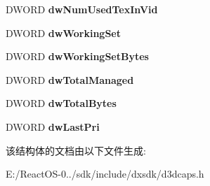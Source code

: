 \begin{DoxyCompactItemize}
D\+W\+O\+RD {\bfseries dw\+Num\+Used\+Tex\+In\+Vid}
\item 
\mbox{\label{struct___d3_d_d_e_v_i_n_f_o___t_e_x_t_u_r_e_m_a_n_a_g_e_r_acc6c6669b580c447033b7dd9b5a75e49}} 
D\+W\+O\+RD {\bfseries dw\+Working\+Set}
\item 
\mbox{\label{struct___d3_d_d_e_v_i_n_f_o___t_e_x_t_u_r_e_m_a_n_a_g_e_r_af2b22a47b65f8ba0104654f09753a4dd}} 
D\+W\+O\+RD {\bfseries dw\+Working\+Set\+Bytes}
\item 
\mbox{\label{struct___d3_d_d_e_v_i_n_f_o___t_e_x_t_u_r_e_m_a_n_a_g_e_r_aa044f4d7877c6bdfdb582fa698e931dc}} 
D\+W\+O\+RD {\bfseries dw\+Total\+Managed}
\item 
\mbox{\label{struct___d3_d_d_e_v_i_n_f_o___t_e_x_t_u_r_e_m_a_n_a_g_e_r_a27299f6736945b3150b912683c08e0ba}} 
D\+W\+O\+RD {\bfseries dw\+Total\+Bytes}
\item 
\mbox{\label{struct___d3_d_d_e_v_i_n_f_o___t_e_x_t_u_r_e_m_a_n_a_g_e_r_acc52256b59d408ce8d25c1e77d53e35a}} 
D\+W\+O\+RD {\bfseries dw\+Last\+Pri}
\end{DoxyCompactItemize}


该结构体的文档由以下文件生成\+:\begin{DoxyCompactItemize}
\item 
E\+:/\+React\+O\+S-\/0../sdk/include/dxsdk/d3dcaps.\+h\end{DoxyCompactItemize}
